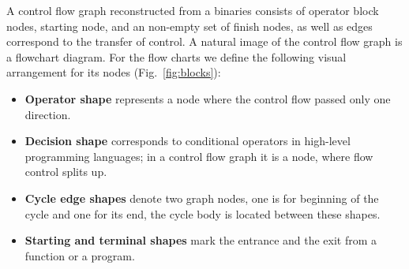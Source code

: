 \documentclass[conference]{IEEEtran}
\begin{document}
A control flow graph reconstructed from a binaries consists of operator block nodes, starting node, and an non-empty set of finish nodes, as well as edges correspond to the transfer of control.  A natural image of the control flow graph is a flowchart diagram.  For the flow charts we define the following visual arrangement for its nodes (Fig.~\ref{fig:blocks}):
\begin{itemize}
\item []\textbf{Operator shape} represents a node where the control flow passed only one direction.
\item []\textbf{Decision shape} corresponds to conditional operators in high-level programming languages; in a control flow graph it is a node, where flow control splits up.
\item []\textbf{Cycle edge shapes} denote two graph nodes, one is for beginning of the cycle and one for its end, the cycle body is located between these shapes.
\item []\textbf{Starting and terminal shapes} mark the entrance and the exit from a function or a program.
\end{itemize}
\end{document}
